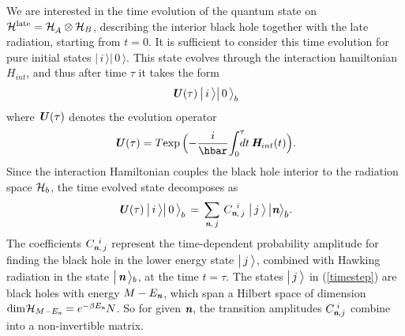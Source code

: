 \documentclass[12pt]{article}%
\def\spc{\hspace{.5pt}}
\def\be{\begin{equation}}
\def\ee{\end{equation}}
\begin{document}
We are interested in the time evolution of the quantum state on ${\cal H}^{\rm late} = {\cal H}_\AA \otimes {\cal H}_B$, describing the interior black hole together with the late radiation, starting from $t=0$. It is sufficient to consider this time evolution  for pure initial states 
$\bigl|\,i\, \bigr\rangle |\,0\,\bigr\rangle$. This state evolves  through the interaction hamiltonian $H_{int}$, and thus after time $\tau$  it
takes the form  
$$
\sS(\tau) \spc \,\bigll|\,\iii\,\bigrr\rangle \bigll|\,0\, \bigrr\rangle_\bB
$$
where $\mbox{\textit{\textbf{U}}}(\tau)$ denotes the evolution operator
\be
\uU({\tau})= T\! \exp\,\Bigl(- \frac{i}{\hbar}\!\int_0^{\tau} \!\!\!\! dt\, \hH_{int}(t)\Bigr).
\ee
Since the interaction Hamiltonian couples the black hole interior to the radiation space ${\cal H}_\bB$, the time evolved state
decomposes as
\be
\label{timestep}
\sS(\tau) \spc
\,\bigll|\,\iii\,\bigrr\rangle \bigll|\,0\, \bigrr\rangle_\bB \,=\, \sum_{\nomt, \,\jjj }\, 
C_{{ \nomt,\,\jjj}}^{\,\; \iii} \;   \bigll |\,\jjj \,\bigrr\rangle\,  
\bigll | \nom \bigrr \rangle_\bbbb .
\ee
The coefficients $C_{{ { \textit{\textbf n}},\,j}}^{\,\; i}$ represent the time-dependent probability amplitude for finding the black hole in the lower energy state $\bigl|\,j\,\bigr\rangle$, combined with Hawking radiation in the state $\bigl| \,{ \textit{\textbf n}}\,\bigr \rangle{}_{{\mbox{\scriptsize $b$}}}$, at the time $t=\tau$.  
The states $\bigl|\,j\,\bigr\rangle$ in (\ref{timestep}) are black holes with energy $M-E_{ \textit{\textbf n}}$, which span a Hilbert space
of dimension ${\rm dim}\spc {\cal H}_{M-E_\nom} = e^{-\beta E_\nom} N$. So for given ${ \textit{\textbf n}}$, the transition amplitudes $C_{{ \textit{\textbf n}},j}^{\; i}$ 
combine into a non-invertible matrix. 
\end{document}
